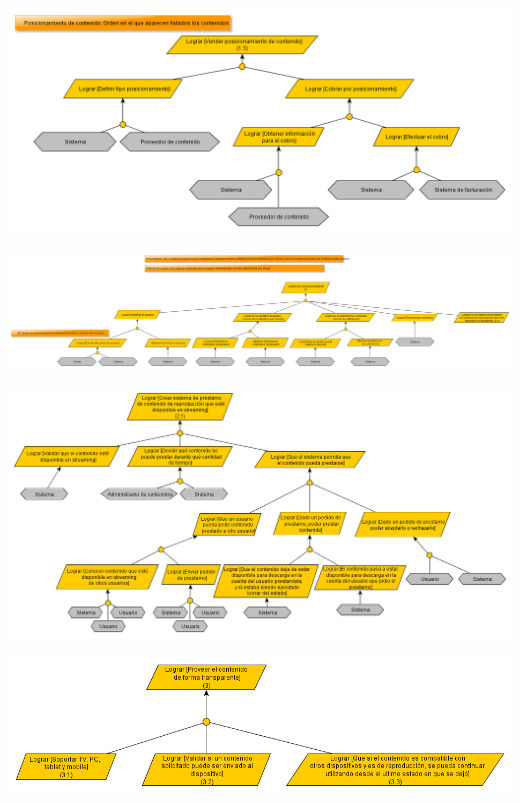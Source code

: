 \documentclass[11pt, a4paper, spanish]{article}
\begin{document}
\newpage
	\begin{center}
		\includegraphics[scale=0.35]{Diagramas/1-5ModelodeObjetivosVenderposicionamiento.png}
	\end{center}
\newpage
	\begin{center}
		\includegraphics[scale=0.35]{Diagramas/2ModelodeObjetivosPersonalizado.png}
	\end{center}
\newpage
	\begin{center}
		\includegraphics[scale=0.35]{Diagramas/2-1ModelodeObjetivosPrestamocontenidos.png}
	\end{center}
\newpage
	\begin{center}
		\includegraphics[scale=0.35]{Diagramas/3ModelodeObjetivosTransparente.png}
	\end{center}
\end{document}
